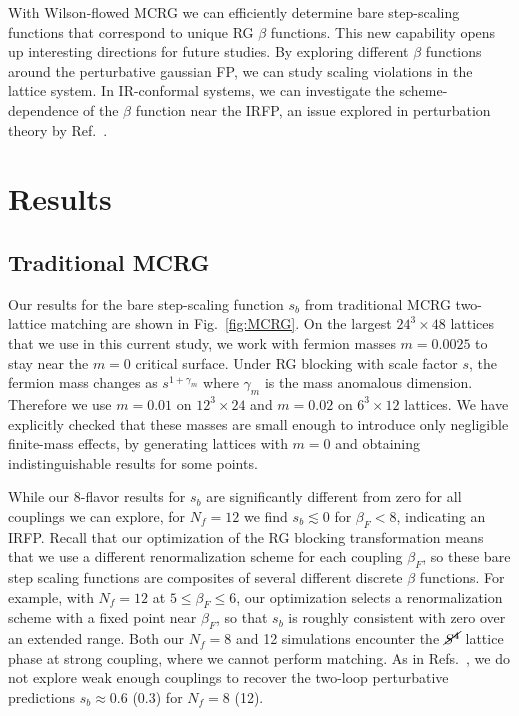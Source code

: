 \documentclass{PoS}
\newcommand{\be}{\ensuremath{\beta} }
\newcommand{\ga}{\ensuremath{\gamma} }
\newcommand{\lsim}{\ensuremath{\lesssim} }
\newcommand{\X}{\ensuremath{\!\times\!} }
\newcommand{\Sb}{\ensuremath{\cancel{S^4}} }
\newcommand{\refcite}[1]{Ref.~\cite{#1}}
\newcommand{\fig}[1]{Fig.~\ref{#1}}
\begin{document}
With Wilson-flowed MCRG we can efficiently determine bare step-scaling functions that correspond to unique RG \be functions.
This new capability opens up interesting directions for future studies.
By exploring different \be functions around the perturbative gaussian FP, we can study scaling violations in the lattice system.
In IR-conformal systems, we can investigate the scheme-dependence of the \be function near the IRFP, an issue explored in perturbation theory by \refcite{Ryttov:2012nt}.



\section{Results} %
\subsection{\label{sec:MCRGresults}Traditional MCRG} %
Our results for the bare step-scaling function $s_b$ from traditional MCRG two-lattice matching are shown in \fig{fig:MCRG}.
On the largest $24^3\X48$ lattices that we use in this current study, we work with fermion masses $m = 0.0025$ to stay near the $m = 0$ critical surface.
Under RG blocking with scale factor $s$, the fermion mass changes as $s^{1 + \ga_m}$ where $\ga_m$ is the mass anomalous dimension.
Therefore we use $m = 0.01$ on $12^3\X24$ and $m = 0.02$ on $6^3\X12$ lattices.
We have explicitly checked that these masses are small enough to introduce only negligible finite-mass effects, by generating lattices with $m = 0$ and obtaining indistinguishable results for some points.

While our 8-flavor results for $s_b$ are significantly different from zero for all couplings we can explore, for $N_f = 12$ we find $s_b \lsim 0$ for $\be_F < 8$, indicating an IRFP.
Recall that our optimization of the RG blocking transformation means that we use a different renormalization scheme for each coupling $\be_F$, so these bare step scaling functions are composites of several different discrete \be functions.
For example, with $N_f = 12$ at $5 \leq \be_F \leq 6$, our optimization selects a renormalization scheme with a fixed point near $\be_F$, so that $s_b$ is roughly consistent with zero over an extended range.
Both our $N_f = 8$ and 12 simulations encounter the \Sb lattice phase at strong coupling, where we cannot perform matching.
As in Refs.~\cite{Hasenfratz:2011xn, Hasenfratz:2011np}, we do not explore weak enough couplings to recover the two-loop perturbative predictions $s_b \approx 0.6$ (0.3) for $N_f = 8$ (12).
\end{document}
